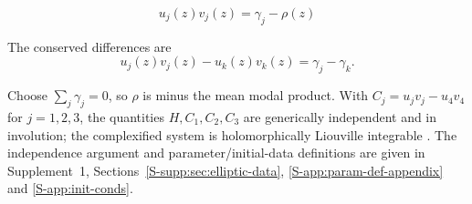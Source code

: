 \documentclass{optica-article}
\numberwithin{equation}{section}
\begin{document}
\begin{equation}
\label{eq:uvj-gam-rho}
u_j(z) v_j(z) = \gamma_j - \rho(z)
\end{equation}

The conserved differences are
\begin{equation}
\label{eq:power-conserved}
u_j(z) v_j(z) - u_k(z) v_k(z) = \gamma_j - \gamma_k.
\end{equation}

Choose $\sum_j\gamma_j=0$, so $\rho$ is minus the mean modal product.
With $C_j=u_jv_j-u_4v_4$ for $j=1,2,3$, the quantities $H,C_1,C_2,C_3$ are generically independent and in involution; the complexified system is holomorphically Liouville integrable \cite{arnoldMathematicalMethodsClassical1989}.
The independence argument and parameter/initial-data definitions are given in Supplement~1, Sections~\ref*{S-supp:sec:elliptic-data}, \ref*{S-app:param-def-appendix} and \ref*{S-app:init-conds}.
\end{document}
